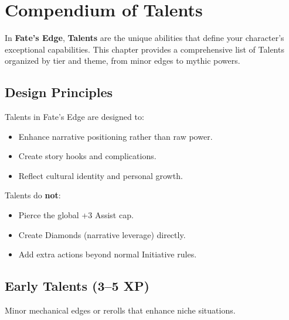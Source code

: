 
\chapter{Compendium of Talents}

In \textbf{Fate’s Edge}, \textbf{Talents} are the unique abilities that define your character’s exceptional capabilities. This chapter provides a comprehensive list of Talents organized by tier and theme, from minor edges to mythic powers.

\section{Design Principles}

Talents in Fate’s Edge are designed to:

\begin{itemize}
  \item Enhance narrative positioning rather than raw power.
  \item Create story hooks and complications.
  \item Reflect cultural identity and personal growth.
\end{itemize}

Talents do \textbf{not}:
\begin{itemize}
  \item Pierce the global +3 Assist cap.
  \item Create Diamonds (narrative leverage) directly.
  \item Add extra actions beyond normal Initiative rules.
\end{itemize}

\section{Early Talents (3–5 XP)}

Minor mechanical edges or rerolls that enhance niche situations.

